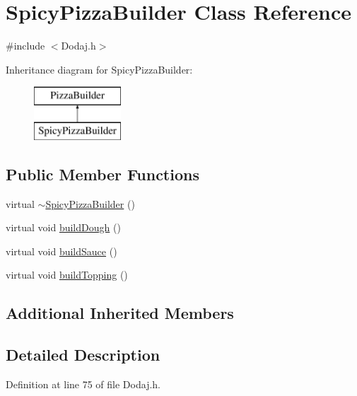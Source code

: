 \hypertarget{class_spicy_pizza_builder}{\section{Spicy\-Pizza\-Builder Class Reference}
\label{class_spicy_pizza_builder}
}


{\ttfamily \#include $<$Dodaj.\-h$>$}

Inheritance diagram for Spicy\-Pizza\-Builder\-:\begin{figure}[H]
\begin{center}
\leavevmode
\includegraphics[height=2.000000cm]{class_spicy_pizza_builder}
\end{center}
\end{figure}
\subsection*{Public Member Functions}
\begin{DoxyCompactItemize}
\item 
virtual \hyperlink{class_spicy_pizza_builder_ada134c577c76bbe33589074d1eca989b}{$\sim$\-Spicy\-Pizza\-Builder} ()
\item 
virtual void \hyperlink{class_spicy_pizza_builder_a31a9b83aff106bf255cdd7b07428cc8f}{build\-Dough} ()
\item 
virtual void \hyperlink{class_spicy_pizza_builder_a74a4d62a67d118b8bbe94721847f38b4}{build\-Sauce} ()
\item 
virtual void \hyperlink{class_spicy_pizza_builder_a18fccc77e058f373deb851d61074df5b}{build\-Topping} ()
\end{DoxyCompactItemize}
\subsection*{Additional Inherited Members}


\subsection{Detailed Description}


Definition at line 75 of file Dodaj.\-h.



